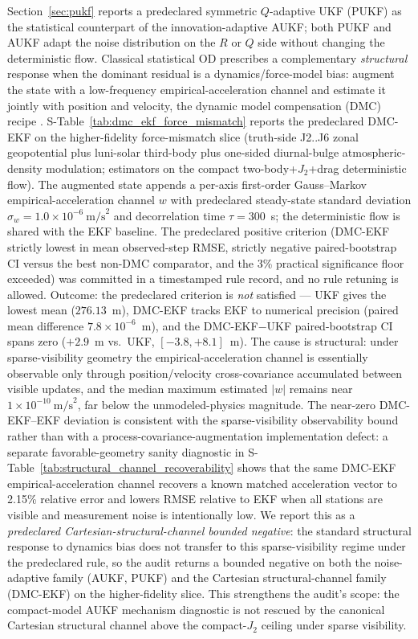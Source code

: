 \documentclass{article}
\begin{document}
Section~\ref{sec:pukf} reports a predeclared symmetric $Q$-adaptive UKF (PUKF) as the statistical counterpart of the innovation-adaptive AUKF; both PUKF and AUKF adapt the noise distribution on the $R$ or $Q$ side without changing the deterministic flow. Classical statistical OD prescribes a complementary \emph{structural} response when the dominant residual is a dynamics/force-model bias: augment the state with a low-frequency empirical-acceleration channel and estimate it jointly with position and velocity, the dynamic model compensation (DMC) recipe \cite{tapley2004statistical,wright1981drag,stacey2021adaptive}. S-Table~\ref{tab:dmc_ekf_force_mismatch} reports the predeclared DMC-EKF on the higher-fidelity force-mismatch slice (truth-side J2..J6 zonal geopotential plus luni-solar third-body plus one-sided diurnal-bulge atmospheric-density modulation; estimators on the compact two-body+$J_2$+drag deterministic flow). The augmented state appends a per-axis first-order Gauss--Markov empirical-acceleration channel $w$ with predeclared steady-state standard deviation $\sigma_w=1.0\times10^{-6}~\text{m/s}^2$ and decorrelation time $\tau=300$~s; the deterministic flow is shared with the EKF baseline. The predeclared positive criterion (DMC-EKF strictly lowest in mean observed-step RMSE, strictly negative paired-bootstrap CI versus the best non-DMC comparator, and the 3\% practical significance floor exceeded) was committed in a timestamped rule record, and no rule retuning is allowed. Outcome: the predeclared criterion is \emph{not} satisfied --- UKF gives the lowest mean ($276.13$~m), DMC-EKF tracks EKF to numerical precision (paired mean difference $7.8\times10^{-6}$~m), and the DMC-EKF$-$UKF paired-bootstrap CI spans zero ($+2.9$~m vs.\ UKF, $[-3.8, +8.1]$~m). The cause is structural: under sparse-visibility geometry the empirical-acceleration channel is essentially observable only through position/velocity cross-covariance accumulated between visible updates, and the median maximum estimated $|w|$ remains near $1\times10^{-10}~\text{m/s}^2$, far below the unmodeled-physics magnitude. The near-zero DMC-EKF--EKF deviation is consistent with the sparse-visibility observability bound rather than with a process-covariance-augmentation implementation defect: a separate favorable-geometry sanity diagnostic in S-Table~\ref{tab:structural_channel_recoverability} shows that the same DMC-EKF empirical-acceleration channel recovers a known matched acceleration vector to 2.15\% relative error and lowers RMSE relative to EKF when all stations are visible and measurement noise is intentionally low. We report this as a \emph{predeclared Cartesian-structural-channel bounded negative}: the standard structural response to dynamics bias does not transfer to this sparse-visibility regime under the predeclared rule, so the audit returns a bounded negative on both the noise-adaptive family (AUKF, PUKF) and the Cartesian structural-channel family (DMC-EKF) on the higher-fidelity slice. This strengthens the audit's scope: the compact-model AUKF mechanism diagnostic is not rescued by the canonical Cartesian structural channel above the compact-$J_2$ ceiling under sparse visibility.
\end{document}
